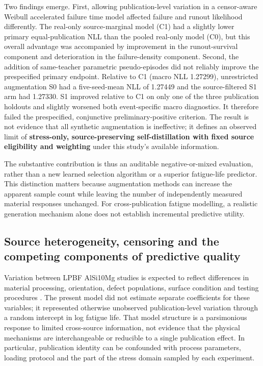 \documentclass[12pt,a4paper]{article}
\begin{document}
Two findings emerge. First, allowing publication-level variation in a censor-aware Weibull accelerated failure time model affected failure and runout likelihood differently. The real-only source-marginal model (C1) had a slightly lower primary equal-publication NLL than the pooled real-only model (C0), but this overall advantage was accompanied by improvement in the runout-survival component and deterioration in the failure-density component. Second, the addition of same-teacher parametric pseudo-episodes did not reliably improve the prespecified primary endpoint. Relative to C1 (macro NLL 1.27299), unrestricted augmentation S0 had a five-seed-mean NLL of 1.27449 and the source-filtered S1 arm had 1.27330. S1 improved relative to C1 on only one of the three publication holdouts and slightly worsened both event-specific macro diagnostics. It therefore failed the prespecified, conjunctive preliminary-positive criterion. The result is not evidence that all synthetic augmentation is ineffective; it defines an observed limit of \textbf{stress-only, source-preserving self-distillation with fixed source eligibility and weighting} under this study's available information.

The substantive contribution is thus an auditable negative-or-mixed evaluation, rather than a new learned selection algorithm or a superior fatigue-life predictor. This distinction matters because augmentation methods can increase the apparent sample count while leaving the number of independently measured material responses unchanged. For cross-publication fatigue modelling, a realistic generation mechanism alone does not establish incremental predictive utility.

\subsection{Source heterogeneity, censoring and the competing components of predictive quality}

Variation between LPBF AlSi10Mg studies is expected to reflect differences in material processing, orientation, defect populations, surface condition and testing procedures \cite{wu2021,vanderrest2025}. The present model did not estimate separate coefficients for these variables; it represented otherwise unobserved publication-level variation through a random intercept in log fatigue life. That model structure is a parsimonious response to limited cross-source information, not evidence that the physical mechanisms are interchangeable or reducible to a single publication effect. In particular, publication identity can be confounded with process parameters, loading protocol and the part of the stress domain sampled by each experiment.
\end{document}
